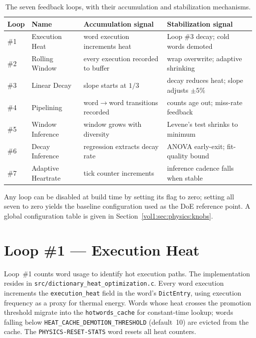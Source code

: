 \begin{table}[ht]
\centering
\small
\begin{tabular}{llll}
\toprule
Loop & Name & Accumulation signal & Stabilization signal \\
\midrule
\#1 & Execution Heat       & word execution increments heat          & Loop \#3 decay; cold words demoted \\
\#2 & Rolling Window       & every execution recorded to buffer      & wrap overwrite; adaptive shrinking \\
\#3 & Linear Decay         & slope starts at $1/3$                   & decay reduces heat; slope adjusts $\pm 5\%$ \\
\#4 & Pipelining           & word$\rightarrow$word transitions recorded & counts age out; miss-rate feedback \\
\#5 & Window Inference     & window grows with diversity             & Levene's test shrinks to minimum \\
\#6 & Decay Inference      & regression extracts decay rate          & ANOVA early-exit; fit-quality bound \\
\#7 & Adaptive Heartrate   & tick counter increments                 & inference cadence falls when stable \\
\bottomrule
\end{tabular}
\caption{The seven feedback loops, with their accumulation and stabilization mechanisms.}
\label{vol1:tab:physics:loops}
\end{table}

Any loop can be disabled at build time by setting its flag to zero; setting
all seven to zero yields the baseline configuration used as the DoE reference
point. A global configuration table is given in
Section~\ref{vol1:sec:physics:knobs}.

\section{Loop \#1 --- Execution Heat}
\label{vol1:sec:physics:loop1}


Loop~\#1 counts word usage to identify hot execution paths. The implementation
resides in \texttt{src/dictionary\_heat\_optimization.c}. Every word execution
increments the \texttt{execution\_heat} field in the word's \texttt{DictEntry},
using execution frequency as a proxy for thermal energy. Words whose heat
crosses the promotion threshold migrate into the \texttt{hotwords\_cache} for
constant-time lookup; words falling below \texttt{HEAT\_CACHE\_DEMOTION\_THRESHOLD}
(default~10) are evicted from the cache. The \texttt{PHYSICS-RESET-STATS} word
resets all heat counters.

